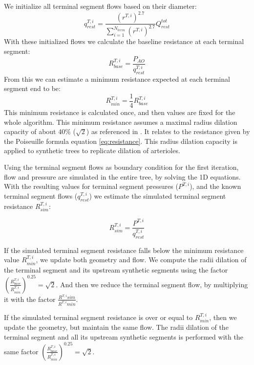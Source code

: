 \documentclass[journal]{IEEEtran}
\begin{document}
We initialize all terminal segment flows based on their diameter: 
\begin{equation}\label{eq:qti}
q^{T,i}_{rest} = \frac{(r^{T,i})^{2.7}}{\sum\limits_{i=1}^{N_{term}} (r^{T,i})^{2.7}}Q^{tot}_{rest}
\end{equation}
With these initialized flows we calculate the baseline resistance at each terminal segment:
\begin{equation}
R^{T,i}_{base}= \frac{P_{AO}}{q^{T,i}_{rest}}
\end{equation}
From this we can estimate a minimum resistance expected at each terminal segment end to be:
\begin{equation}
R^{T,i}_{min} = \frac{1}{4}R^{T,i}_{base}
\end{equation}
This minimum resistance is calculated once, and then values are fixed for the whole algorithm. This minimum resistance assumes a maximal radius dilation capacity of about 40\% ($\sqrt{2}$) as referenced in \cite{wilson1990effects}. It relates to the resistance given by the Poiseuille formula equation \ref{eq:resistance}. This radius dilation capacity is applied to synthetic trees to replicate dilation of arterioles. 

Using the terminal segment flows as boundary condition for the first iteration, flow and pressure are simulated in the entire tree, by solving the 1D equations. With the resulting values for terminal segment pressures ($P^{T,i}$), and the known terminal segment flows ($q^{T,i}_{rest}$) we estimate the simulated terminal segment resistance $R^{T,i}_{sim}$:

\begin{equation}
R^{T,i}_{sim} = \frac{P^{T,i}}{q^{T,i}_{rest}}
\end{equation}

If the simulated terminal segment resistance falls below the minimum resistance value $R^{T,i}_{min}$, we update both geometry and flow. We compute the radii dilation of the terminal segment and its upstream synthetic segments using the factor $\left(\frac{R^{T,i}_{base}}{R^{T,i}_{min}}\right)^{0.25}= \sqrt{2}$. And then we reduce the terminal segment flow, by multiplying it with the factor $\frac{R^{T,i}{sim}}{R^{T,i}{min}}$.

If the simulated terminal segment resistance is over or equal to $R^{T,i}_{min}$, then we update the geometry, but maintain the same flow. The radii dilation of the terminal segment and all its upstream synthetic segments is performed with the same factor $\left(\frac{R^{T,i}_{base}}{R^{T,i}_{min}} \right) ^{0.25}= \sqrt{2}$. 
\end{document}
